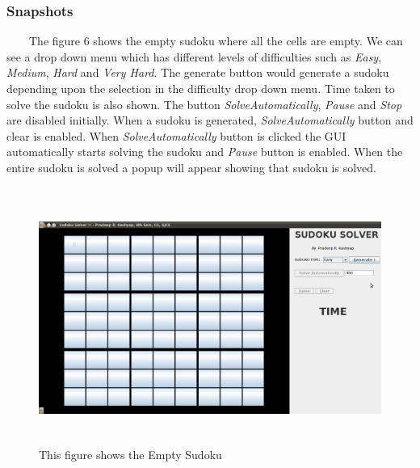 \documentclass[12pt,a4paper]{article}
\begin{document}
\subsubsection{Snapshots}
\ \ \ \ The figure 6 shows the empty sudoku where all the cells are empty. We can see a drop down menu which has different levels of difficulties such as \textit{Easy}, \textit{Medium}, \textit{Hard} and \textit{Very Hard}. The generate button would generate a sudoku depending upon the selection in the difficulty drop down menu. Time taken to solve the sudoku is also shown. The button \textit{SolveAutomatically}, \textit{Pause} and  \textit{Stop} are disabled initially. When a sudoku is generated, \textit{SolveAutomatically} button and clear is enabled. When \textit{SolveAutomatically} button is clicked the GUI automatically starts solving the sudoku and \textit{Pause} button is enabled. When the entire sudoku is solved a popup will appear showing that sudoku is solved.
\begin{figure}[H]
\begin{center}
\ \newline
\includegraphics[height=75mm, width=150mm]{emptysudoku.png}
\caption{This figure shows the Empty Sudoku }
\end{center}
\end{figure}
\end{document}
